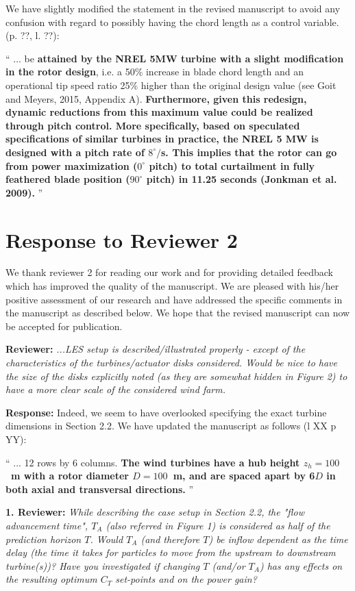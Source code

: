 \documentclass[]{article}
\begin{document}
We have slightly modified the statement in the revised manuscript to avoid any confusion with regard to possibly having the chord length as a control variable. (p. ??, l. ??):

``
... be \textbf{attained by the NREL 5MW turbine with a slight modification in the rotor design}, i.e. a 50\% increase in blade chord length and an operational tip speed ratio 25\% higher than 
the original design value (see Goit and Meyers, 2015, Appendix A). \textbf{Furthermore, given this redesign, dynamic reductions from this maximum value could be realized through pitch control. More specifically, based on speculated specifications of similar turbines in practice, the NREL 5 MW is designed with a pitch rate of $8^{\circ}/$s. This implies that the rotor can go from power maximization ($0^\circ$ pitch) to total curtailment in fully feathered blade position ($90^\circ$ pitch) in 11.25 seconds (Jonkman et al. 2009).}
''




\clearpage
\section*{Response to Reviewer 2}
We thank reviewer 2 for reading our work and for providing detailed feedback which has improved the quality of the manuscript. We are pleased with his/her positive assessment of our research and have addressed the specific comments in the manuscript as described below. We hope that the revised manuscript can now be accepted for publication. 

\dotfill

\textbf{Reviewer: } \textit{...LES setup is described/illustrated properly - except of the characteristics of the turbines/actuator disks considered. Would be nice to have the size of the disks explicitly noted (as they are somewhat hidden in Figure 2) to have a more clear scale of the considered wind farm.}

\textbf{Response: } Indeed, we seem to have overlooked specifying the exact turbine dimensions in Section 2.2. We have updated the manuscript as follows (l XX p YY): 

``
... 12 rows by 6 columns. \textbf{The wind turbines have a hub height $z_h = 100$~m with a rotor diameter $D = 100$~m, and are spaced apart by 6$D$ in both axial and transversal directions.}
''

\dotfill

\textbf{1. Reviewer: } \textit{While describing the case setup in Section 2.2, the "flow advancement time", $T_A$ (also
	referred in Figure 1) is considered as half of the prediction horizon $T$. Would $T_A$ (and
	therefore $T$) be inflow dependent as the time delay (the time it takes for particles to
	move from the upstream to downstream turbine(s))? Have you investigated if changing
	$T$ (and/or $T_A$) has any effects on the resulting optimum $C_T$ set-points and on the power
	gain?}
\end{document}
